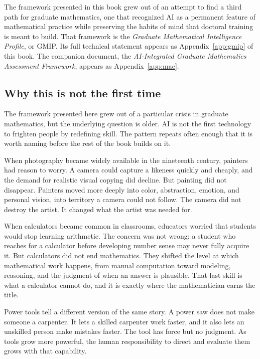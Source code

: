 \documentclass{SIAMbook2023}
\begin{document}
\begin{thepreface}
The framework presented in this book grew out of an attempt to find a third path for graduate mathematics, one that recognized AI as a permanent feature of mathematical practice while preserving the habits of mind that doctoral training is meant to build. That framework is the \emph{Graduate Mathematical Intelligence Profile}, or GMIP. Its full technical statement appears as Appendix~\ref{app:gmip} of this book. The companion document, the \emph{AI-Integrated Graduate Mathematics Assessment Framework}, appears as Appendix~\ref{app:mae}.

\subsection*{Why this is not the first time}

The framework presented here grew out of a particular crisis in graduate mathematics, but the underlying question is older. AI is not the first technology to frighten people by redefining skill. The pattern repeats often enough that it is worth naming before the rest of the book builds on it.

When photography became widely available in the nineteenth century, painters had reason to worry. A camera could capture a likeness quickly and cheaply, and the demand for realistic visual copying did decline. But painting did not disappear. Painters moved more deeply into color, abstraction, emotion, and personal vision, into territory a camera could not follow. The camera did not destroy the artist. It changed what the artist was needed for.

When calculators became common in classrooms, educators worried that students would stop learning arithmetic. The concern was not wrong: a student who reaches for a calculator before developing number sense may never fully acquire it. But calculators did not end mathematics. They shifted the level at which mathematical work happens, from manual computation toward modeling, reasoning, and the judgment of when an answer is plausible. That last skill is what a calculator cannot do, and it is exactly where the mathematician earns the title.

Power tools tell a different version of the same story. A power saw does not make someone a carpenter. It lets a skilled carpenter work faster, and it also lets an unskilled person make mistakes faster. The tool has force but no judgment. As tools grow more powerful, the human responsibility to direct and evaluate them grows with that capability.


\end{thepreface}
\end{document}
